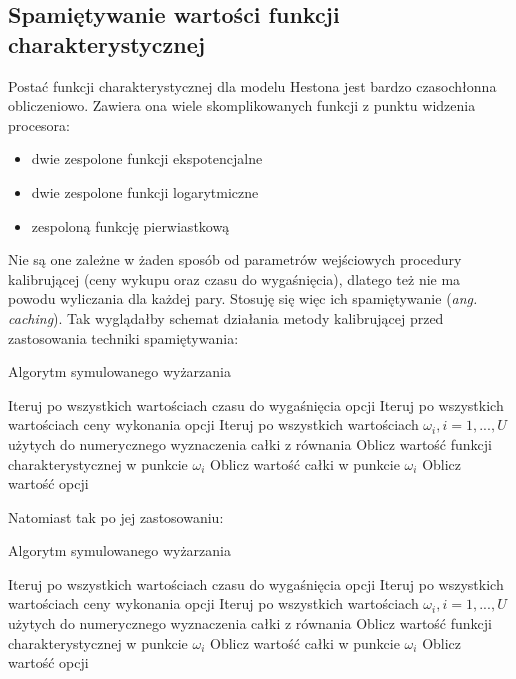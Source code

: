 \documentclass{pracamgr}
\begin{document}
\subsection{Spamiętywanie wartości funkcji charakterystycznej}
Postać funkcji charakterystycznej dla modelu Hestona jest bardzo czasochłonna obliczeniowo. 
Zawiera ona wiele skomplikowanych funkcji z punktu widzenia procesora:
\begin{itemize}
  \item dwie zespolone funkcji ekspotencjalne
  \item dwie zespolone funkcji logarytmiczne
  \item zespoloną funkcję pierwiastkową
\end{itemize}
Nie są one zależne w żaden sposób od parametrów wejściowych procedury kalibrującej (ceny wykupu oraz 
czasu do wygaśnięcia), dlatego też nie ma powodu wyliczania dla każdej pary. 
Stosuję się więc ich spamiętywanie (\textit{ang. caching}).
Tak wyglądałby schemat działania metody kalibrującej przed zastosowania techniki spamiętywania:
\begin{algorithm}[H]
\caption{Algorytm symulowanego wyżarzania}\label{euclid}

\begin{algorithmic}[1]
  
  \State Iteruj po wszystkich wartościach czasu do wygaśnięcia opcji
  \State Iteruj po wszystkich wartościach ceny wykonania opcji
  \State Iteruj po wszystkich wartościach $\omega_i, i = 1, ..., U $ użytych do numerycznego wyznaczenia całki z równania   
  \State Oblicz wartość funkcji charakterystycznej w punkcie $\omega_i$
  \State Oblicz wartość całki w punkcie $\omega_i$
  \State Oblicz wartość opcji

\end{algorithmic}
\label{alg:simulatedAnnealing}
\end{algorithm}


Natomiast tak po jej zastosowaniu:

\begin{algorithm}[H]
\caption{Algorytm symulowanego wyżarzania}\label{euclid}

\begin{algorithmic}[1]
  
  \State Iteruj po wszystkich wartościach czasu do wygaśnięcia opcji
  \State Iteruj po wszystkich wartościach ceny wykonania opcji
  \State Iteruj po wszystkich wartościach $\omega_i, i = 1, ..., U $ użytych do numerycznego wyznaczenia całki z równania   
  \State Oblicz wartość funkcji charakterystycznej w punkcie $\omega_i$
  \State Oblicz wartość całki w punkcie $\omega_i$
  \State Oblicz wartość opcji

\end{algorithmic}
\label{alg:simulatedAnnealing}
\end{algorithm}
\end{document}

